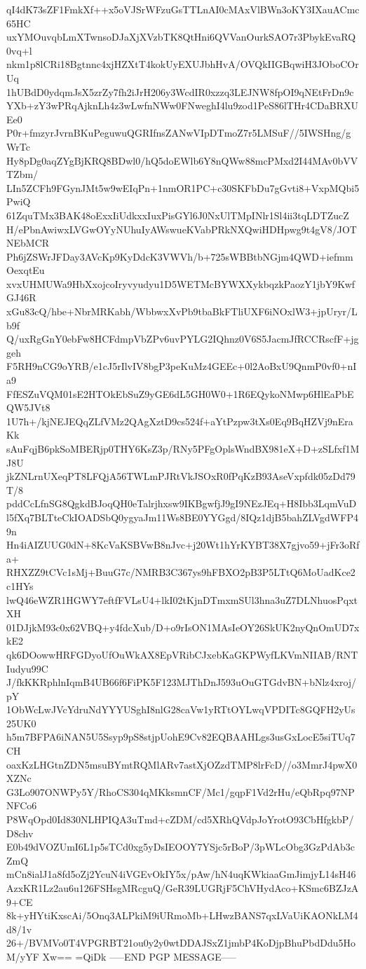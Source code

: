 qI4dK73sZF1FmkXf++x5oVJSrWFzuGsTTLnAI0cMAxVlBWn3oKY3IXauACmc65HC
uxYMOuvqbLmXTwnsoDJaXjXVzbTK8QtHni6QVVanOurkSAO7r3PbykEvaRQ0vq+l
nkm1p8lCRi18Bgtnnc4xjHZXtT4kokUyEXUJbhHvA/OVQkIIGBqwiH3JOboCOrUq
1hUBdD0ydqmJsX5zrZy7fh2iJrH206y3WcdIR0xzzq3LEJNW8fpOI9qNEtFrDn9c
YXb+zY3wPRqAjknLh4z3wLwfnNWw0FNweghI4lu9zod1PeS86lTHr4CDaBRXUEe0
P0r+fmzyrJvrnBKuPeguwuQGRIfnsZANwVIpDTmoZ7r5LMSuF//5IWSHng/gWrTc
Hy8pDg0aqZYgBjKRQ8BDwl0/hQ5doEWlb6Y8nQWw88mcPMxd2I44MAv0bVVTZbm/
LIn5ZCFh9FGynJMt5w9wEIqPn+1nmOR1PC+c30SKFbDu7gGvti8+VxpMQbi5PwiQ
61ZquTMx3BAK48oExxIiUdkxxIuxPisGYl6J0NxUlTMpINlr1Sl4ii3tqLDTZucZ
H/ePbnAwiwxLVGwOYyNUhuIyAWswueKVabPRkNXQwiHDHpwg9t4gV8/JOTNEbMCR
Ph6jZSWrJFDay3AVcKp9KyDdcK3VWVh/b+725sWBBtbNGjm4QWD+iefmmOexqtEu
xvxUHMUWa9HbXxojcoIryvyudyu1D5WETMcBYWXXykbqzkPaozY1jbY9KwfGJ46R
xGu83cQ/hbe+NbrMRKabh/WbbwxXvPb9tbaBkFTliUXF6iNOxlW3+jpUryr/Lb9f
Q/uxRgGnY0ebFw8HCFdmpVbZPv6uvPYLG2IQhnz0V6S5JacmJfRCCRscfF+jggeh
F5RH9nCG9oYRB/e1cJ5rIlvIV8bgP3peKuMz4GEEc+0l2AoBxU9QnmP0vf0+nIa9
FfESZuVQM01sE2HTOkEbSuZ9yGE6dL5GH0W0+1R6EQykoNMwp6HlEaPbEQW5JVt8
1U7h+/kjNEJEQqZLfVMz2QAgXztD9cs524f+aYtPzpw3tXs0Eq9BqHZVj9nEraKk
sAuFqjB6pkSoMBERjp0THY6KsZ3p/RNy5PFgOplsWndBX981eX+D+zSLfxf1MJ8U
jkZNLrnUXeqPT8LFQjA56TWLmPJRtVkJSOxR0fPqKzB93AseVxpfdk05zDd79T/8
pddCcLfnSG8QgkdBJoqQH0eTalrjhxsw9IKBgwfjJ9gI9NEzJEq+H8Ibb3LqmVuD
l5fXq7BLTteCkIOADSbQ0ygyaJm11Ws8BE0YYGgd/8IQz1djB5bahZLVgdWFP49n
Hn4iAIZUUG0dN+8KcVaKSBVwB8nJvc+j20Wt1hYrKYBT38X7gjvo59+jFr3oRfa+
RHXZZ9tCVc1sMj+BuuG7c/NMRB3C367ys9hFBXO2pB3P5LTtQ6MoUadKce2c1HYs
lwQ46eWZR1HGWY7eftfFVLsU4+lkI02tKjnDTmxmSUl3hna3uZ7DLNhuosPqxtXH
01DJjkM93c0x62VBQ+y4fdcXub/D+o9rIsON1MAsIeOY26SkUK2nyQnOmUD7xkE2
qk6DOowwHRFGDyoUfOuWkAX8EpVRibCJxebKaGKPWyfLKVmNIIAB/RNTIudyu99C
J/fkKKRphlnIqmB4UB66f6FiPK5F123MJThDnJ593uOuGTGdvBN+bNlz4xroj/pY
1ObWcLwJVcYdruNdYYYUSghI8nlG28caVw1yRTtOYLwqVPDITc8GQFH2yUs25UK0
h5m7BFPA6iNAN5U5Ssyp9pS8stjpUohE9Cv82EQBAAHLgs3usGxLocE5siTUq7CH
oaxKzLHGtnZDN5msuBYmtRQMlARv7astXjOZzdTMP8lrFcD//o3MmrJ4pwX0XZNc
G3Lo907ONWPy5Y/RhoCS304qMKksmnCF/Mc1/gqpF1Vd2rHu/eQbRpq97NPNFCo6
P8WqOpd0Id830NLHPIQA3uTmd+cZDM/cd5XRhQVdpJoYrotO93CbHfgkbP/D8chv
E0b49dVOZUmI6L1p5sTCd0xg5yDsIEOOY7YSjc5rBoP/3pWLcObg3GzPdAb3cZmQ
mCn8ialJ1a8fd5oZj2YcuN4iVGEvOkIY5x/pAw/hN4uqKWkiaaGmJimjyL14sH46
AzxKR1Lz2au6u126FSHsgMRcguQ/GeR39LUGRjF5ChVHydAco+KSmc6BZJzA9+CE
8k+yHYtiKxscAi/5Onq3ALPkiM9iURmoMb+LHwzBANS7qxLVaUiKAONkLM4d8/1v
26+/BVMVo0T4VPGRBT21ou0y2y0wtDDAJSxZ1jmbP4KoDjpBhuPbdDdu5HoM/yYF
Xw==
=QiDk
-----END PGP MESSAGE-----
